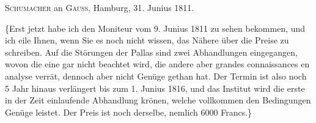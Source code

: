 \par{}\bigskip
\begin{center}
\textsc{Schumacher} an \textsc{Gauss}, Hamburg, 31. Junius 1811.
\end{center}
\noindent\hspace*{\parindent}\{Erst jetzt habe ich den Moniteur vom 9. Junius 1811 zu sehen bekommen, und ich eile Ihnen, wenn Sie es noch nicht wissen, das Nähere über die Preise zu schreiben. Auf die Störungen der Pallas sind zwei Abhandlungen eingegangen, wovon die eine gar nicht beachtet wird, die andere aber grandes connaissances en analyse verrät, dennoch aber nicht Genüge gethan hat. Der Termin ist also noch 5 Jahr hinaus verlängert bis zum 1. Junius 1816, und das Institut wird die erste in der Zeit einlaufende Abhandlung krönen, welche vollkommen den Bedingungen Genüge leistet. Der Preis ist noch derselbe, nemlich 6000 Francs.\}
\par
